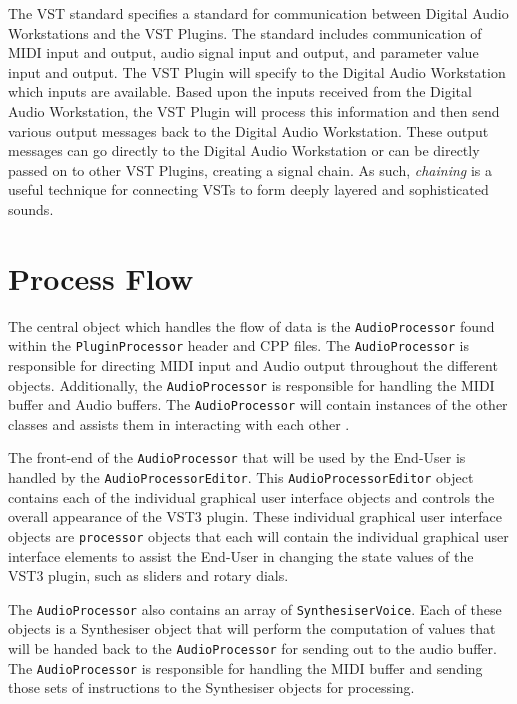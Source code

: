 \documentclass[a4paper,12pt]{report}
\begin{document}
The VST standard specifies a standard for communication between Digital Audio Workstations and the VST Plugins. The standard includes communication of MIDI input and output, audio signal input and output, and parameter value input and output. The VST Plugin will specify to the Digital Audio Workstation which inputs are available. Based upon the inputs received from the Digital Audio Workstation, the VST Plugin will process this information and then send various output messages back to the Digital Audio Workstation. These output messages can go directly to the Digital Audio Workstation or can be directly passed on to other VST Plugins, creating a signal chain. As such, \emph{chaining} is a useful technique for connecting VSTs to form deeply layered and sophisticated sounds.

\section{Process Flow}
\label{sec:processflow}
The central object which handles the flow of data is the \texttt{Audio\-Processor} found within the \texttt{Plugin\-Processor} header and CPP files. The \texttt{Audio\-Processor} is responsible for directing MIDI input and Audio output throughout the different objects. Additionally, the \texttt{Audio\-Processor} is responsible for handling the MIDI buffer and Audio buffers. The \texttt{Audio\-Processor} will contain instances of the other classes and assists them in interacting with each other \cite{juceclassindex}.

The front-end of the \texttt{Audio\-Processor} that will be used by the End-User is handled by the \texttt{Audio\-Processor\-Editor}. This \texttt{Audio\-Processor\-Editor} object contains each of the individual graphical user interface objects and controls the overall appearance of the VST3 plugin. These individual graphical user interface objects are \texttt{processor} objects that each will contain the individual graphical user interface elements to assist the End-User in changing the state values of the VST3 plugin, such as sliders and rotary dials.

The \texttt{Audio\-Processor} also contains an array of \texttt{Synthesiser\-Voice}. Each of these objects is a Synthesiser object that will perform the computation of values that will be handed back to the \texttt{Audio\-Processor}  for sending out to the audio buffer. The \texttt{Audio\-Processor} is responsible for handling the MIDI buffer and sending those sets of instructions to the Synthesiser objects for processing.
\end{document}
